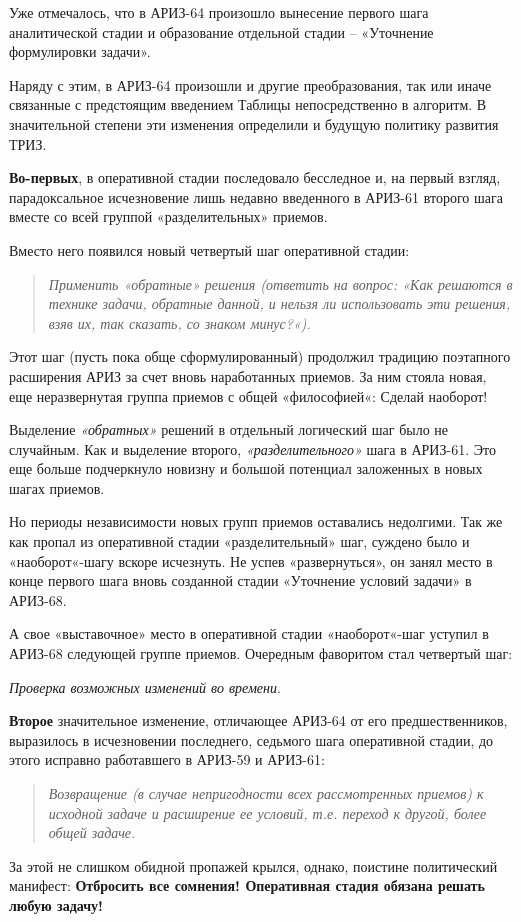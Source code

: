 \documentclass[11pt,a4paper]{article}
\begin{document}
Уже отмечалось, что в АРИЗ-64 произошло вынесение первого шага аналитической
стадии и образование отдельной стадии -- «Уточнение формулировки задачи».

Наряду с этим, в АРИЗ-64 произошли и другие преобразования, так или иначе
связанные с предстоящим введением Таблицы непосредственно в алгоритм. В
значительной степени эти изменения определили и будущую политику развития
ТРИЗ.

\textbf{Во-первых}, в оперативной стадии последовало бесследное и, на первый
взгляд, парадоксальное исчезновение лишь недавно введенного в АРИЗ-61 второго
шага вместе со всей группой «разделительных» приемов.

Вместо него появился новый четвертый шаг оперативной стадии:
\begin{quote}\it  
  Применить «обратные» решения (ответить на вопрос: «Как решаются в технике
  задачи, обратные данной, и нельзя ли использовать эти решения, взяв их, так
  сказать, со знаком минус?«).
\end{quote}
Этот шаг (пусть пока обще сформулированный) продолжил традицию поэтапного
расширения АРИЗ за счет вновь наработанных приемов. За ним стояла новая, еще
неразвернутая группа приемов с общей «философией«: Сделай наоборот!

Выделение \emph{«обратных»} решений в отдельный логический шаг было не
случайным. Как и выделение второго, \emph{«разделительного»} шага в АРИЗ-61.
Это еще больше подчеркнуло новизну и большой потенциал заложенных в новых
шагах приемов.

Но периоды независимости новых групп приемов оставались недолгими. Так же как
пропал из оперативной стадии «разделительный» шаг, суждено было и
«наоборот«-шагу вскоре исчезнуть. Не успев «развернуться», он занял место в
конце первого шага вновь созданной стадии «Уточнение условий задачи» в
АРИЗ-68.

А свое «выставочное» место в оперативной стадии «наоборот«-шаг уступил в
АРИЗ-68 следующей группе приемов. Очередным фаворитом стал четвертый шаг:

\emph{Проверка возможных изменений во времени}.

\textbf{Второе} значительное изменение, отличающее АРИЗ-64 от его
предшественников, выразилось в исчезновении последнего, седьмого шага
оперативной стадии, до этого исправно работавшего в АРИЗ-59 и АРИЗ-61:
\begin{quote}\it  
  Возвращение (в случае непригодности всех рассмотренных приемов) к исходной
  задаче и расширение ее условий, т.е. переход к другой, более общей задаче.
\end{quote}
За этой не слишком обидной пропажей крылся, однако, поистине политический
манифест: \textbf{Отбросить все сомнения! Оперативная стадия обязана решать
  любую задачу!}
\end{document}
